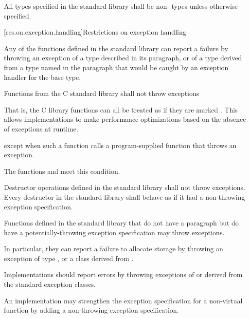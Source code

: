 \pnum
All types specified in the \Cpp{} standard library shall be non- types
unless otherwise specified.

[res.on.exception.handling]{Restrictions on exception handling}%
%

\pnum
Any of the functions defined in the \Cpp{} standard library
%
can report a failure by throwing an exception of a type
described in its \throws paragraph,
or of a type derived from a type named in the \throws paragraph
that would be caught by an exception handler for the base type.

\pnum
Functions from the C standard library shall not throw exceptions%
%
\begin{footnote}
That is, the C
library functions can all be treated as if they
are marked .
This allows implementations to make performance optimizations
based on the absence of exceptions at runtime.
\end{footnote}
except when such a function calls a program-supplied function that throws an
exception.
\begin{footnote}
The functions
and
 meet this condition.
\end{footnote}

\pnum
Destructor operations defined in the \Cpp{} standard library
shall not throw exceptions.
Every destructor in the \Cpp{} standard library shall behave as if it had a
non-throwing exception specification.

\pnum
Functions defined in the
\Cpp{} standard library
%
that do not have a \throws paragraph
but do have a potentially-throwing exception specification
may throw  exceptions.
\begin{footnote}
In particular, they
can report a failure to allocate storage by throwing an exception of type
,
or a class derived from
.
\end{footnote}
Implementations should
report errors by throwing exceptions of or derived
from the standard
exception classes.

\pnum
An implementation may strengthen the
exception specification
for a non-virtual function
by adding a non-throwing exception specification.

